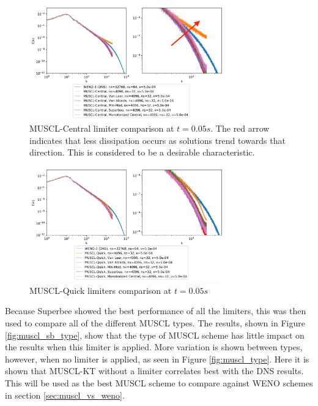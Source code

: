 \documentclass[conf]{new-aiaa}
\begin{document}
\begin{figure}[hbt!]
	\centering
	\includegraphics[width=0.75\textwidth]{figures/MUSCL_CS_Limiter_Comparison_Ek_vs_k.png}
	\caption{MUSCL-Central limiter comparison at $t=0.05s$. The red arrow
	indicates that less dissipation occurs as solutions trend towards that
	direction. This is considered to be a desirable characteristic.}
	\label{fig:muscl_cs_lim}
\end{figure}

\begin{figure}[hbt!]
	\centering
	\includegraphics[width=0.75\textwidth]{figures/MUSCL_Q_Limiters_Comparison_Ek_vs_k.png}
	\caption{MUSCL-Quick limiters comparison at $t=0.05s$}
	\label{fig:muscl_q_lim}
\end{figure}

Because Superbee showed the best performance of all the limiters, this was then
used to compare all of the different MUSCL types. The results, shown in Figure
\ref{fig:muscl_sb_type}, show that the type of MUSCL scheme has little impact
on the results when this limiter is applied. More variation is shown between
types, however, when no limiter is applied, as seen in Figure
\ref{fig:muscl_type}. Here it is shown that MUSCL-KT without a limiter
correlates best with the DNS results. This will be used as the best MUSCL
scheme to compare against WENO schemes in section \ref{sec:muscl_vs_weno}.
\end{document}
